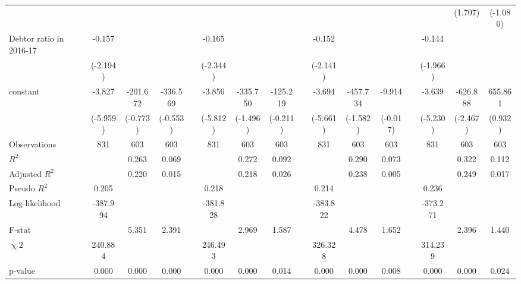 {\begin{longtable}{@{\extracolsep{\fill}}lccccccccccccccc}
      &   &   &   &   &   &   &   &   &   &   &   &   &   & (1.707) & (-1.080) \\
    Debtor ratio in 2016-17 & -0.157 &   &   &   & -0.165 &   &   &   & -0.152 &   &   &   & -0.144 &   &  \\
      & (-2.194) &   &   &   & (-2.344) &   &   &   & (-2.141) &   &   &   & (-1.966) &   &  \\
    constant & -3.827 & -201.672 & -336.569 &   & -3.856 & -335.750 & -125.219 &   & -3.694 & -457.734 & -9.914 &   & -3.639 & -626.888 & 655.861 \\
      & (-5.959) & (-0.773) & (-0.553) &   & (-5.812) & (-1.496) & (-0.211) &   & (-5.661) & (-1.582) & (-0.017) &   & (-5.230) & (-2.467) & (0.932) \\
    \midrule
    Observations & 831 & 603 & 603 &   & 831 & 603 & 603 &   & 831 & 603 & 603 &   & 831 & 603 & 603 \\
    $R^2$ &   & 0.263 & 0.069 &   &   & 0.272 & 0.092 &   &   & 0.290 & 0.073 &   &   & 0.322 & 0.112 \\
    Adjusted $R^2$ &   & 0.220 & 0.015 &   &   & 0.218 & 0.026 &   &   & 0.238 & 0.005 &   &   & 0.249 & 0.017 \\
    Pseudo $R^2$ & 0.205 &   &   &   & 0.218 &   &   &   & 0.214 &   &   &   & 0.236 &   &  \\
    Log-likelihood & -387.994 &   &   &   & -381.828 &   &   &   & -383.822 &   &   &   & -373.271 &   &  \\
    F-stat &   & 5.351 & 2.391 &   &   & 2.969 & 1.587 &   &   & 4.478 & 1.652 &   &   & 2.396 & 1.440 \\
    $\upchi2$ & 240.884 &   &   &   & 246.493 &   &   &   & 326.328 &   &   &   & 314.239 &   &  \\
    p-value & 0.000 & 0.000 & 0.000 &   & 0.000 & 0.000 & 0.014 &   & 0.000 & 0.000 & 0.008 &   & 0.000 & 0.000 & 0.024 \\
    \bottomrule
    \end{longtable}%
}